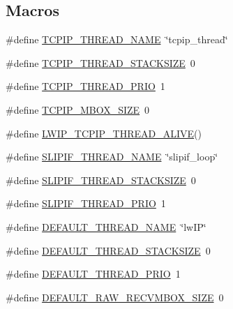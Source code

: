 \subsection*{Macros}
\begin{DoxyCompactItemize}
\item 
\#define \hyperlink{group__lwip__opts__thread_ga405e604e4328e1feb878c6fe1798a587}{T\+C\+P\+I\+P\+\_\+\+T\+H\+R\+E\+A\+D\+\_\+\+N\+A\+ME}~\char`\"{}tcpip\+\_\+thread\char`\"{}
\item 
\#define \hyperlink{group__lwip__opts__thread_gaa02b84eafa0c8b09b158b97c96d79db0}{T\+C\+P\+I\+P\+\_\+\+T\+H\+R\+E\+A\+D\+\_\+\+S\+T\+A\+C\+K\+S\+I\+ZE}~0
\item 
\#define \hyperlink{group__lwip__opts__thread_ga42b2c7a3042d7c3efd00f367f5837435}{T\+C\+P\+I\+P\+\_\+\+T\+H\+R\+E\+A\+D\+\_\+\+P\+R\+IO}~1
\item 
\#define \hyperlink{group__lwip__opts__thread_ga8cf210ad4e4bf616860a45fbd140fd06}{T\+C\+P\+I\+P\+\_\+\+M\+B\+O\+X\+\_\+\+S\+I\+ZE}~0
\item 
\#define \hyperlink{group__lwip__opts__thread_ga8b99d75d9e0a0868567d10c8522915bb}{L\+W\+I\+P\+\_\+\+T\+C\+P\+I\+P\+\_\+\+T\+H\+R\+E\+A\+D\+\_\+\+A\+L\+I\+VE}()
\item 
\#define \hyperlink{group__lwip__opts__thread_gae9cd260c56472324a2f0ee5f9597a675}{S\+L\+I\+P\+I\+F\+\_\+\+T\+H\+R\+E\+A\+D\+\_\+\+N\+A\+ME}~\char`\"{}slipif\+\_\+loop\char`\"{}
\item 
\#define \hyperlink{group__lwip__opts__thread_gae8ab54a25007ce997bbab6289815e258}{S\+L\+I\+P\+I\+F\+\_\+\+T\+H\+R\+E\+A\+D\+\_\+\+S\+T\+A\+C\+K\+S\+I\+ZE}~0
\item 
\#define \hyperlink{group__lwip__opts__thread_gab1b9fc2efcbf1f804bfd0191bc019c4e}{S\+L\+I\+P\+I\+F\+\_\+\+T\+H\+R\+E\+A\+D\+\_\+\+P\+R\+IO}~1
\item 
\#define \hyperlink{group__lwip__opts__thread_gaca13123a5c8271558353e04123957616}{D\+E\+F\+A\+U\+L\+T\+\_\+\+T\+H\+R\+E\+A\+D\+\_\+\+N\+A\+ME}~\char`\"{}lw\+IP\char`\"{}
\item 
\#define \hyperlink{group__lwip__opts__thread_ga7f93dfeaed4021061959f822def602cb}{D\+E\+F\+A\+U\+L\+T\+\_\+\+T\+H\+R\+E\+A\+D\+\_\+\+S\+T\+A\+C\+K\+S\+I\+ZE}~0
\item 
\#define \hyperlink{group__lwip__opts__thread_ga3d8715b1fdd0449d6c214e4a40108456}{D\+E\+F\+A\+U\+L\+T\+\_\+\+T\+H\+R\+E\+A\+D\+\_\+\+P\+R\+IO}~1
\item 
\#define \hyperlink{group__lwip__opts__thread_ga4ef8f046c957750056131310a1580df7}{D\+E\+F\+A\+U\+L\+T\+\_\+\+R\+A\+W\+\_\+\+R\+E\+C\+V\+M\+B\+O\+X\+\_\+\+S\+I\+ZE}~0

\end{DoxyCompactItemize}
